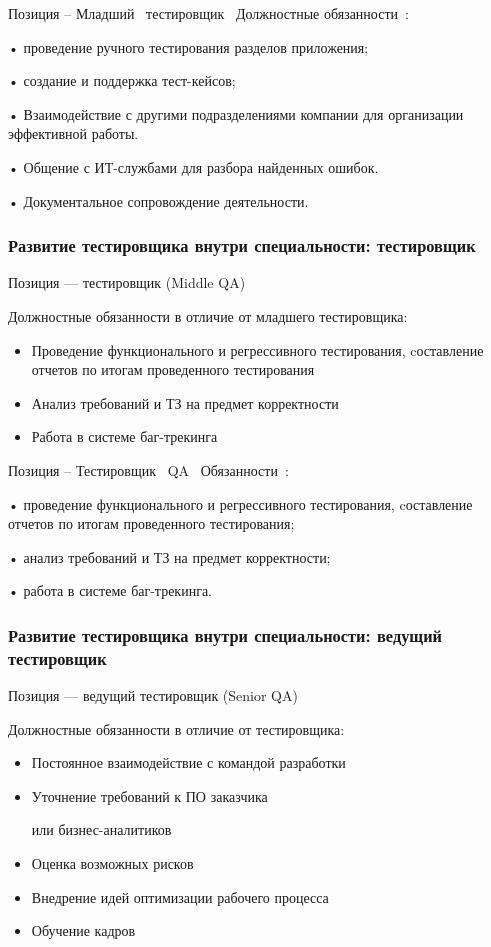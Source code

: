 \documentclass{../industrial-development}
\begin{document}
\lecturenotes

Позиция – Младший~\cite{hh} тестировщик~\cite{itcf}
Должностные обязанности~\cite{rab}: 

•	проведение ручного тестирования разделов приложения;

•	создание и поддержка тест-кейсов;

•	Взаимодействие с другими подразделениями компании для организации эффективной работы.

•	Общение с ИТ-службами для разбора найденных ошибок.

•	Документальное сопровождение деятельности.

\begin{frame} \frametitle{Развитие тестировщика внутри специальности: тестировщик}
 \begin{block}{}
  \alert{Позиция --- тестировщик (Middle QA)}

Должностные обязанности в отличие от младшего тестировщика: 
  \end{block}
  \begin{itemize}
  \item Проведение функционального и регрессивного тестирования, cоставление отчетов по итогам проведенного тестирования
  \item Анализ требований и ТЗ на предмет корректности
  \item Работа в системе баг-трекинга
  \end{itemize}
\end{frame}

\lecturenotes

Позиция – Тестировщик~\cite{hh} QA~\cite{itcf}
Обязанности~\cite{rab}:

•	проведение функционального и регрессивного тестирования, cоставление отчетов по итогам проведенного тестирования;

•	анализ требований и ТЗ на предмет корректности;

•	работа в системе баг-трекинга.

\begin{frame} \frametitle{Развитие тестировщика внутри специальности: ведущий тестировщик}
 \begin{block}{}
  \alert{Позиция --- ведущий тестировщик (Senior QA)}

Должностные обязанности в отличие от тестировщика: 
  \end{block}
  \begin{itemize}
  \item Постоянное взаимодействие с командой разработки
  \item Уточнение требований к ПО заказчика 

или бизнес-аналитиков
  \item Оценка возможных рисков
 \item Внедрение идей оптимизации рабочего процесса
 \item Обучение кадров
  \end{itemize}
\end{frame}
\end{document}
